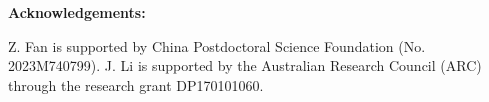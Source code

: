 \documentclass[12pt]{amsart}
\begin{document}
\bigskip

 \noindent
 {\bf Acknowledgements:}


Z. Fan is supported by China Postdoctoral Science Foundation
(No. 2023M740799). J. Li is supported by the Australian Research Council (ARC) through the
research grant DP170101060.







%
%
%
%
%
%
%
\end{document}

